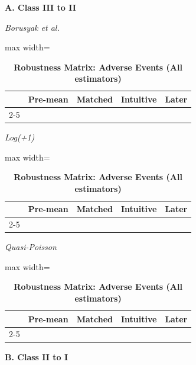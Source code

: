 \documentclass[letterpaper,12pt]{article}
\theoremstyle{definition}
\begin{document}
\clearpage
\newpage


\begin{table}[t]
\centering
\caption{\textbf{Robustness Matrix: Adverse Events (All estimators)}}
\begin{threeparttable}

\noindent\makebox[\textwidth]{\rule{\textwidth}{0.5pt}}

\vspace{-13pt}

\noindent\makebox[\textwidth]{\rule{\textwidth}{0.5pt}}

\begin{minipage}[t]{0.49\textwidth}
\centering\footnotesize
\textbf{A. Class III to II}\par\vspace{4pt}

\emph{Borusyak et al.}\par
\begin{adjustbox}{max width=\linewidth}
\begin{tabular}{@{}lcccc@{}}
\toprule
 & Pre-mean & Matched & Intuitive & Later \\
\cmidrule(lr){2-5}

\bottomrule
\end{tabular}
\end{adjustbox}\vspace{6pt}

\emph{Log(+1)}\par
\begin{adjustbox}{max width=\linewidth}
\begin{tabular}{@{}lcccc@{}}
\toprule
 & Pre-mean & Matched & Intuitive & Later \\
\cmidrule(lr){2-5}

\bottomrule
\end{tabular}
\end{adjustbox}\vspace{6pt}

\emph{Quasi-Poisson}\par
\begin{adjustbox}{max width=\linewidth}
\begin{tabular}{@{}lcccc@{}}
\toprule
 & Pre-mean & Matched & Intuitive & Later \\
\cmidrule(lr){2-5}

\bottomrule
\end{tabular}
\end{adjustbox}
\end{minipage}\hfill
\begin{minipage}[t]{0.49\textwidth}
\centering\footnotesize
\textbf{B. Class II to I}\par\vspace{4pt}


\end{minipage}
\end{threeparttable}
\end{table}
\end{document}
